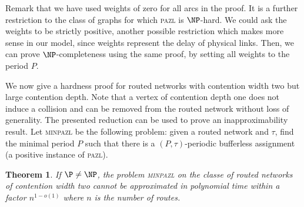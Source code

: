 \documentclass[a4paper,10pt]{journal}
\newtheorem{theorem}{Theorem}
\newcommand\pazl{\textsc{pazl}\xspace}
\newcommand\minpazl{\textsc{minpazl}\xspace}
\begin{document}
 Remark that we have used weights of zero for all arcs in the proof. It is a further restriction to the 
 class of graphs for which \pazl is $\NP$-hard. We could ask the weights to be strictly positive, another possible restriction which makes more sense in our model, since weights represent the delay of physical links. Then, we can prove $\NP$-completeness using the same proof, by setting all weights to the period $P$.

We now give a hardness proof for routed networks with contention width two but large contention depth. Note that a vertex of contention depth one does not induce a collision and can be removed from the routed network without loss of generality. The presented reduction can be used to prove an inapproximability result. Let \minpazl be the following problem: given a routed network and $\tau$, find the minimal period $P$ such that there is a $(P,\tau)$-periodic bufferless assignment (a positive instance of \pazl). 


\begin{theorem}\label{th:inapprox}
If $\P \neq \NP$, the problem \minpazl on the classe of routed networks of contention width two cannot be approximated in polynomial time within a factor $n^{1-o(1)}$ where $n$ is the number of routes.
\end{theorem}
\end{document}
